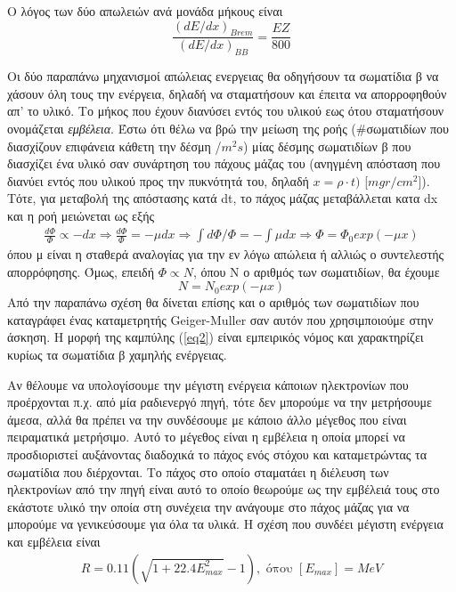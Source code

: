 \documentclass[a4paper]{article}
\begin{document}
	Ο λόγος των δύο απωλειών ανά μονάδα μήκους είναι 
		\begin{equation}\label{eq1}
			\frac{(dE/dx)_{Brem}}{(dE/dx)_{BB}} = \frac{EZ}{800}
		\end{equation}

Οι δύο παραπάνω μηχανισμοί απώλειας ενεργειας θα οδηγήσουν τα σωματίδια β να χάσουν όλη τους την ενέργεια, δηλαδή να σταματήσουν και έπειτα να απορροφηθούν απ' το υλικό. Το μήκος που έχουν διανύσει εντός του υλικού εως ότου σταματήσουν ονομάζεται \textit{εμβέλεια}. 
Έστω ότι θέλω να βρώ την μείωση της ροής (\#σωματιδίων που διασχίζουν επιφάνεια κάθετη την δέσμη /$m^2s$) μίας δέσμης σωματιδίων β που διασχίζει ένα υλικό σαν συνάρτηση του πάχους μάζας του (ανηγμένη απόσταση που διανύει εντός που υλικού προς την πυκνότητά του, δηλαδή $ x=\rho \cdot t)$ [$mgr/cm^2$]). 
Τότε, για μεταβολή της απόστασης κατά dt, το πάχος μάζας μεταβάλλεται κατα dx και η ροή μειώνεται ως εξής 
	\begin{align*}
		\frac{d\Phi}{\Phi} \propto -dx\Rightarrow\frac{d\Phi}{\Phi}= - \mu dx \Rightarrow \int d\Phi/\Phi = - \int \mu dx \Rightarrow
			\Phi = \Phi_0 exp(-\mu x)
	\end{align*}	  
	όπου μ είναι η σταθερά αναλογίας για την εν λόγω απώλεια ή αλλιώς ο συντελεστής απορρόφησης. Όμως, επειδή $\Phi \propto N$, όπου Ν ο αριθμός των σωματιδίων, θα έχουμε 
	\begin{equation}\label{eq2}
		N = N_0 exp(-\mu x)
	\end{equation}
Από την παραπάνω σχέση θα δίνεται επίσης και ο αριθμός των σωματιδίων που καταγράφει ένας καταμετρητής Geiger-Muller σαν αυτόν που χρησιμποιούμε στην άσκηση. Η μορφή της καμπύλης (\ref{eq2}) είναι εμπειρικός νόμος και χαρακτηρίζει κυρίως τα σωματίδια β χαμηλής ενέργειας.

	
	Αν θέλουμε να υπολογίσουμε την μέγιστη ενέργεια κάποιων ηλεκτρονίων που προέρχονται π.χ. από μία ραδιενεργό πηγή, τότε δεν μπορούμε να την μετρήσουμε άμεσα, αλλά θα πρέπει να την συνδέσουμε με κάποιο άλλο μέγεθος που είναι πειραματικά μετρήσιμο. Αυτό το μέγεθος είναι η εμβέλεια η οποία μπορεί να προσδιοριστεί αυξάνοντας διαδοχικά το πάχος ενός στόχου και καταμετρώντας τα σωματίδια που διέρχονται. Το πάχος στο οποίο σταματάει η διέλευση των ηλεκτρονίων από την πηγή είναι αυτό το οποίο θεωρούμε ως την εμβέλειά τους στο εκάστοτε υλικό την οποία στη συνέχεια την ανάγουμε στο πάχος μάζας για να μπορούμε να γενικεύσουμε για όλα τα υλικά. Η σχέση που συνδέει μέγιστη ενέργεια και εμβέλεια είναι 
	\begin{align}\label{eq3}
			R = 0.11 (\sqrt{1+22.4E_{max}^2} - 1) , \text{ όπου $[E_{max}]=MeV$}
	\end{align}
	
\end{document}
